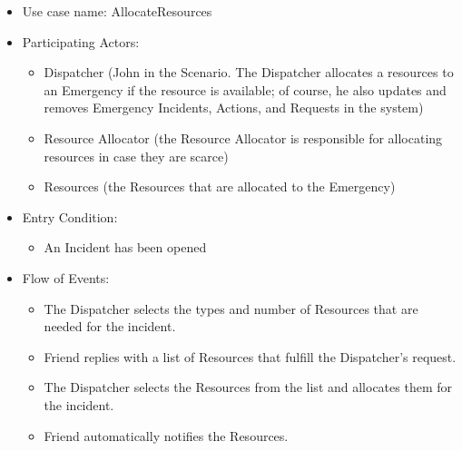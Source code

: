 \begin{examplebox}
    \begin{itemize}
        \item Use case name: AllocateResources
        \item Participating Actors:
        \begin{itemize}
            \item Dispatcher (John in the Scenario. The Dispatcher allocates a resources to an Emergency if the resource is available; of course, he also updates and removes Emergency Incidents, Actions, and Requests in the system)
            
            \item Resource Allocator (the Resource Allocator is responsible for allocating resources in case they are scarce)
            
            \item Resources (the Resources that are allocated to the Emergency)
        \end{itemize}
        \item Entry Condition:
        \begin{itemize}
            \item An Incident has been opened
        \end{itemize}
        \item Flow of Events:
        \begin{itemize}
            \item The Dispatcher selects the types and number of Resources that are needed for the incident.
            
            \item Friend replies with a list of Resources that fulfill the Dispatcher's request.
            
            \item The Dispatcher selects the Resources from the list and allocates them for the incident.
            
            \item Friend automatically notifies the Resources.


\end{itemize}
\end{itemize}
\end{examplebox}
